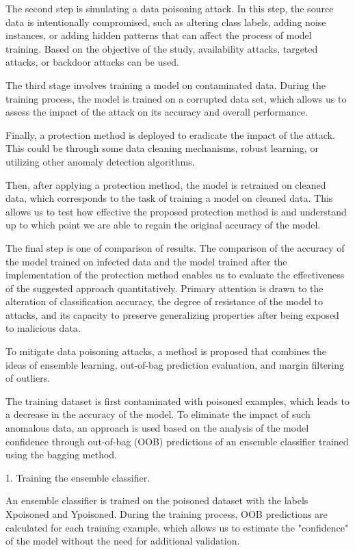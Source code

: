 The second step is simulating a data poisoning attack. In this step, the
source data is intentionally compromised, such as altering class labels,
adding noise instances, or adding hidden patterns that can affect the
process of model training. Based on the objective of the study,
availability attacks, targeted attacks, or backdoor attacks can be used.

The third stage involves training a model on contaminated data. During
the training process, the model is trained on a corrupted data set,
which allows us to assess the impact of the attack on its accuracy and
overall performance.

Finally, a protection method is deployed to eradicate the impact of the
attack. This could be through some data cleaning mechanisms, robust
learning, or utilizing other anomaly detection algorithms.

Then, after applying a protection method, the model is retrained on
cleaned data, which corresponds to the task of training a model on
cleaned data. This allows us to test how effective the proposed
protection method is and understand up to which point we are able to
regain the original accuracy of the model.

The final step is one of comparison of results. The comparison of the
accuracy of the model trained on infected data and the model trained
after the implementation of the protection method enables us to evaluate
the effectiveness of the suggested approach quantitatively. Primary
attention is drawn to the alteration of classification accuracy, the
degree of resistance of the model to attacks, and its capacity to
preserve generalizing properties after being exposed to malicious data.

To mitigate data poisoning attacks, a method is proposed that combines
the ideas of ensemble learning, out-of-bag prediction evaluation, and
margin filtering of outliers.

The training dataset is first contaminated with poisoned examples, which
leads to a decrease in the accuracy of the model. To eliminate the
impact of such anomalous data, an approach is used based on the analysis
of the model confidence through out-of-bag (OOB) predictions of an
ensemble classifier trained using the bagging method.

1. Training the ensemble classifier.

An ensemble classifier is trained on the poisoned dataset with the
labels Xpoisoned and Ypoisoned. During the training process, OOB
predictions are calculated for each training example, which allows us to
estimate the "confidence" of the model without the need for additional
validation.

